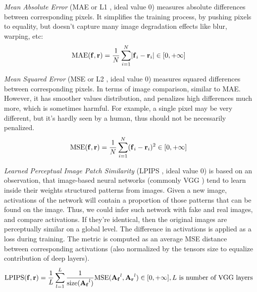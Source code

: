 \textit{Mean Absolute Error} (MAE or L1 \cite{metric:l1-95}, ideal value 0) measures absolute differences between corresponding pixels. It simplifies the training process, by pushing pixels to equality, but doesn't capture many image degradation effects like blur, warping, etc: 
\begin{equation}
	\setlength\abovedisplayskip{2pt}\text{MAE}(\bmr{f}, \bmr{r}) = \frac{1}{N}\sum_{i=1}^{N}\lvert \bmr{f}_i - \bmr{r}_i \rvert \in [0, +\infty]\setlength\belowdisplayskip{2pt}
\end{equation}

\textit{Mean Squared Error} (MSE or L2 \cite{metric:l1-95}, ideal value 0) measures squared differences between corresponding pixels. In terms of image comparison, similar to MAE. However, it has smoother values distribution, and penalizes high differences much more, which is sometimes harmful. For example, a single pixel may be very different, but it's hardly seen by a human, thus should not be necessarily penalized. 
\begin{equation}
	\setlength\abovedisplayskip{2pt}\text{MSE}(\bmr{f}, \bmr{r}) = \frac{1}{N}\sum_{i=1}^{N}(\bmr{f}_i - \bmr{r}_i)^2 \in [0, +\infty]\setlength\belowdisplayskip{2pt}
\end{equation}

\textit{Learned Perceptual Image Patch Similarity} (LPIPS \cite{metric:lpips18}, ideal value 0) is based on an observation, that image-based neural networks (commonly VGG \cite{dnn:vgg14}) tend to learn inside their weights structured patterns from images. Given a new image, activations of the network will contain a proportion of those patterns that can be found on the image. Thus, we could infer such network with fake and real images, and compare activations. If they're identical, then the original images are perceptually similar on a global level. The difference in activations is applied as a loss during training. The metric is computed as an average MSE distance between corresponding activations (also normalized by the tensors size to equalize contribution of deep layers).
\begin{equation}
	\setlength\abovedisplayskip{0pt} 
	\text{LPIPS}(\bmr{f}, \bmr{r}) = \frac{1}{L}\sum_{l=1}^L \frac{1}{\text{size}(\bmr{A_f}^l)}\text{MSE}(\bmr{A_f}^l, \bmr{A_r}^l) \in [0, +\infty], L \text{ is number of VGG layers} \setlength\belowdisplayskip{0pt}
\end{equation}
	
